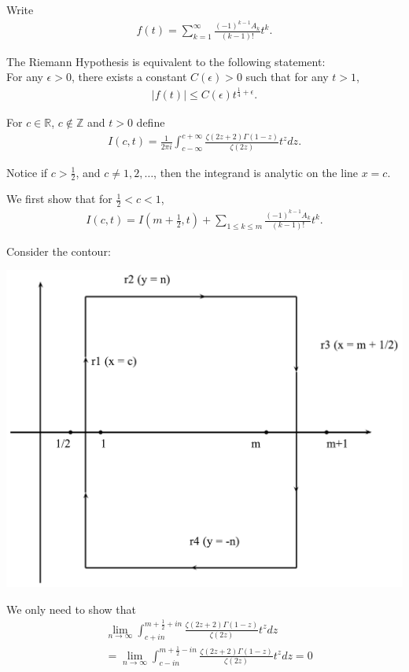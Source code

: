 \documentclass{beamer}
\newcommand{\R}{\mathbb R}
\newcommand{\Z}{\mathbb Z}
\begin{document}
\frame
{
Write 
\begin{align*}
f(t) = \sum^{\infty}_{k = 1} \frac{(-1)^{k-1}A_k}{(k-1)!}t^{k}.
\end{align*}

The Riemann Hypothesis is equivalent to the following statement:\\

For any $\epsilon > 0 $, there exists a constant $C(\epsilon) > 0$ such that for any $t > 1$, 
\begin{align*}
|f(t)| \leq C(\epsilon) t^{\frac{1}{4} + \epsilon}  .
\end{align*}
}

\frame
{
For $c  \in \R$, $ c \notin \Z$ and $t > 0$ define
\begin{align*}
I(c,t) = \frac{1}{2\pi i} \int^{c + \infty}_{c -\infty} \frac{\zeta(2z +2)\Gamma(1-z)}{\zeta(2z)}t^{z} dz.
\end{align*}

Notice if $c > \frac{1}{2}$, and $c \neq 1, 2, \ldots$, then the integrand is analytic on the line $x = c$.

We first show that for $\frac{1}{2} < c < 1$,
\begin{align*}
I(c, t)  =  I(m+\frac{1}{2}, t) + \sum_{1 \leq k \leq m} \frac{(-1)^{k-1}A_{k}}{(k-1)!} t^k.
\end{align*}

}

\frame
{
Consider the contour:
\begin{center}
\includegraphics[scale=0.3]{pics/contour.pdf}
\end{center}

We only need to show that 
\begin{align*}
 &\lim_{n \rightarrow \infty} \int_{c + i n}^{m+ \frac{1}{2} + i n} \frac{\zeta(2z +2)\Gamma(1-z)}{\zeta(2z)}t^{z} dz \\
 &=  \lim_{n \rightarrow \infty} \int_{c - i n}^{m+ \frac{1}{2} - i n} \frac{\zeta(2z +2)\Gamma(1-z)}{\zeta(2z)}t^{z} dz = 0
\end{align*}

}
\end{document}
